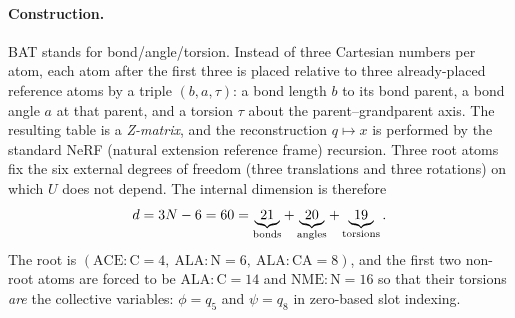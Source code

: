 \documentclass[11pt]{article}
\begin{document}
\paragraph{Construction.}
BAT stands for bond/angle/torsion.  Instead of three Cartesian numbers per
atom, each atom after the first three is placed relative to three
already-placed reference atoms by a triple $(b,a,\tau)$: a bond length $b$ to
its bond parent, a bond angle $a$ at that parent, and a torsion $\tau$ about
the parent--grandparent axis.  The resulting table is a \emph{Z-matrix}, and
the reconstruction $q\mapsto x$ is performed by the standard NeRF (natural
extension reference frame) recursion.  Three root atoms fix the six external
degrees of freedom (three translations and three rotations) on which $U$ does
not depend.  The internal dimension is therefore
\begin{equation}
 d=3N-6=60=\underbrace{21}_{\rm bonds}+\underbrace{20}_{\rm angles}
 +\underbrace{19}_{\rm torsions}.
\end{equation}
The root is $(\mathrm{ACE\!:\!C}=4,\ \mathrm{ALA\!:\!N}=6,\
\mathrm{ALA\!:\!CA}=8)$, and the first two non-root atoms are forced to be
$\mathrm{ALA\!:\!C}=14$ and $\mathrm{NME\!:\!N}=16$ so that their torsions
\emph{are} the collective variables: $\phi=q_5$ and $\psi=q_8$ in
zero-based slot indexing.
\end{document}
